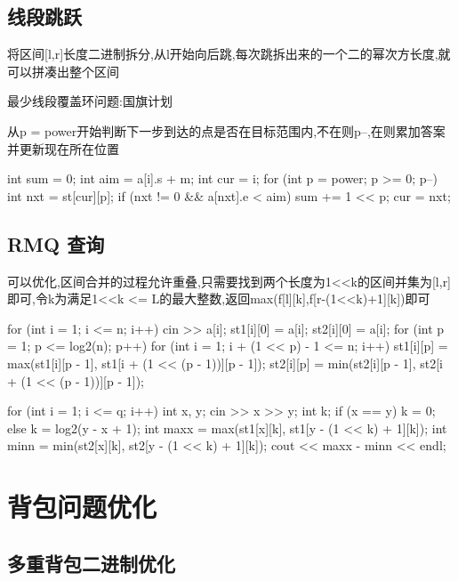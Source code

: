 \documentclass[UTF8,a4paper,11pt]{ctexart}
\begin{document}
\subsection{线段跳跃}

将区间[l,r]长度二进制拆分,从l开始向后跳,每次跳拆出来的一个二的幂次方长度,就可以拼凑出整个区间

最少线段覆盖环问题:国旗计划

从p = power开始判断下一步到达的点是否在目标范围内,不在则p--,在则累加答案并更新现在所在位置

\begin{CodeBlock}
int sum = 0;
int aim = a[i].s + m;
int cur = i;
for (int p = power; p >= 0; p--) {
    int nxt = st[cur][p];
    if (nxt != 0 && a[nxt].e < aim) {
        sum += 1 << p;
        cur = nxt;
    }
}
\end{CodeBlock}

\subsection{RMQ 查询}

可以优化,区间合并的过程允许重叠,只需要找到两个长度为1<<k的区间并集为[l,r]即可,令k为满足1<<k <= L的最大整数,返回max(f[l][k],f[r-(1<<k)+1][k])即可

\begin{CodeBlock}
for (int i = 1; i <= n; i++) {
    cin >> a[i];
    st1[i][0] = a[i];
    st2[i][0] = a[i];
}
for (int p = 1; p <= log2(n); p++) {
    for (int i = 1; i + (1 << p) - 1 <= n; i++) {
        st1[i][p] = max(st1[i][p - 1], st1[i + (1 << (p - 1))][p - 1]);
        st2[i][p] = min(st2[i][p - 1], st2[i + (1 << (p - 1))][p - 1]);
    }
}
\end{CodeBlock}

\begin{CodeBlock}
for (int i = 1; i <= q; i++) {
    int x, y;
    cin >> x >> y;
    int k;
    if (x == y)
        k = 0;
    else
        k = log2(y - x + 1);
    int maxx = max(st1[x][k], st1[y - (1 << k) + 1][k]);
    int minn = min(st2[x][k], st2[y - (1 << k) + 1][k]);
    cout << maxx - minn << endl;
}
\end{CodeBlock}

\section{背包问题优化}

\subsection{多重背包二进制优化}
\end{document}
